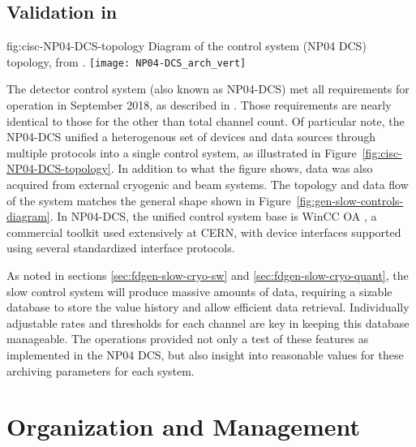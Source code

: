 \subsection{Validation in }
\label{sec:cisc-slow-control-pdsp}

\begin{dunefigure}{fig:cisc-NP04-DCS-topology}
{Diagram of the  control system (NP04 DCS) topology, from \cite{pdspdcs_proc}.}
\texttt{[image: NP04-DCS\_arch\_vert]}
\end{dunefigure}

The  detector control system (also known as NP04-DCS) met
all requirements for operation in September 2018, as
described in \cite{pdspdcs_proc}.  Those requirements are
nearly identical to those for the  other than
total channel count. Of particular note, the NP04-DCS unified a heterogenous set of devices and data sources
through multiple protocols into a
single control system, as illustrated in
Figure~\ref{fig:cisc-NP04-DCS-topology}. In addition to what
the figure shows, data was also acquired from external cryogenic and beam
systems.  The topology and data flow of the system matches the general
shape shown in Figure~\ref{fig:gen-slow-controls-diagram}. In NP04-DCS,
the unified control system base is WinCC OA \cite{winccoa}, a
commercial toolkit used extensively at CERN, with device interfaces
supported using several standardized interface protocols.

As noted in sections \ref{sec:fdgen-slow-cryo-sw} and \ref{sec:fdgen-slow-cryo-quant},
the %
 slow control system will produce massive amounts of
data, requiring a sizable database to store the value history and
allow efficient data retrieval. Individually adjustable rates and
thresholds for each channel are key in keeping this database
manageable. The  operations provided not only a test of
these features as implemented in the NP04 DCS, but also insight into
reasonable values for these archiving parameters for each system.


\section{Organization and Management}
\label{sec:cisc-slow-controls-org}

